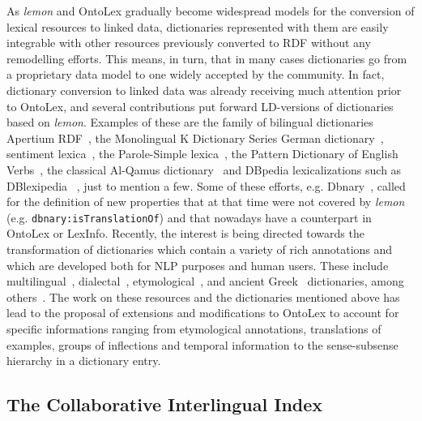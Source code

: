 \documentclass[12pt,a4paper]{elex2017}
\begin{document}
As \textit{lemon} and OntoLex gradually become %
widespread models for the conversion of lexical resources to linked data, dictionaries 
represented with them are easily integrable with other resources previously 
converted to RDF without any remodelling efforts. This means, in turn, that in 
many cases dictionaries go from a proprietary data model to one widely accepted 
by the community. In fact, dictionary conversion to linked data was already receiving 
much attention prior to OntoLex, and several contributions put forward 
LD-versions of dictionaries based on \textit{lemon}. Examples of these are the 
family of bilingual dictionaries Apertium RDF~\citep{gracia2016apertium}, the Monolingual K 
Dictionary Series German dictionary~\citep{klimek2015enhancing}, sentiment lexica~\citep{vulcu2014generating}, the 
Parole-Simple 
lexica~\citep{villegas2015parole}, the Pattern Dictionary of English Verbs~\citep{elmaarouf2014pdev}, the classical Al-Qamus dictionary~\citep{khalfi2016classical} and DBpedia lexicalizations such as DBlexipedia ~\citep{walter2015dblexipedia}, just to mention a few. Some of these efforts, e.g.
Dbnary~\citep{serasset2015dbnary}, 
called for the definition of new properties that at that time were not covered 
by \textit{lemon} (e.g. \texttt{dbnary:isTranslationOf}) and that nowadays have 
a counterpart in OntoLex or LexInfo. Recently, the interest is being directed 
towards the transformation of dictionaries  which contain a variety of rich 
annotations and which are developed both for NLP purposes and human users. These
 include multilingual~\citep{bosque2016modelling}, dialectal~\citep{declerck2016towards}, etymological~\citep{abromeit2016linking}, and ancient Greek~\citep{khan2016representing} dictionaries, among others~\citep{declerk2015towardsENEL}. The work on these 
  resources and the dictionaries mentioned above has lead to the proposal of 
  extensions and modifications to OntoLex to account for specific 
  informations ranging from etymological annotations, translations of examples, 
  groups of inflections and temporal information to the sense-subsense hierarchy in
   a dictionary entry.

\subsection{The Collaborative Interlingual Index}
\end{document}
